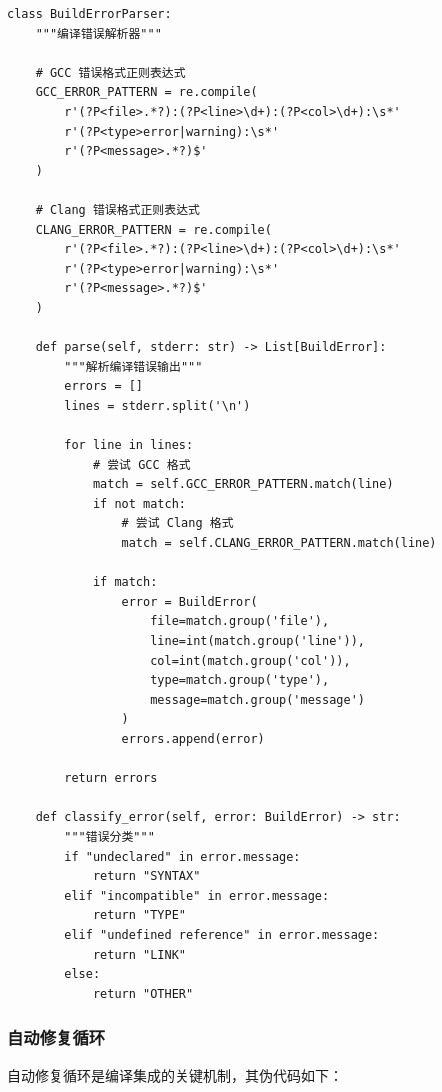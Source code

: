 \begin{lstlisting}[style=Python,abovecaptionskip=0pt,belowcaptionskip=0pt]
class BuildErrorParser:
    """编译错误解析器"""
    
    # GCC 错误格式正则表达式
    GCC_ERROR_PATTERN = re.compile(
        r'(?P<file>.*?):(?P<line>\d+):(?P<col>\d+):\s*'
        r'(?P<type>error|warning):\s*'
        r'(?P<message>.*?)$'
    )
    
    # Clang 错误格式正则表达式
    CLANG_ERROR_PATTERN = re.compile(
        r'(?P<file>.*?):(?P<line>\d+):(?P<col>\d+):\s*'
        r'(?P<type>error|warning):\s*'
        r'(?P<message>.*?)$'
    )
    
    def parse(self, stderr: str) -> List[BuildError]:
        """解析编译错误输出"""
        errors = []
        lines = stderr.split('\n')
        
        for line in lines:
            # 尝试 GCC 格式
            match = self.GCC_ERROR_PATTERN.match(line)
            if not match:
                # 尝试 Clang 格式
                match = self.CLANG_ERROR_PATTERN.match(line)
            
            if match:
                error = BuildError(
                    file=match.group('file'),
                    line=int(match.group('line')),
                    col=int(match.group('col')),
                    type=match.group('type'),
                    message=match.group('message')
                )
                errors.append(error)
        
        return errors
    
    def classify_error(self, error: BuildError) -> str:
        """错误分类"""
        if "undeclared" in error.message:
            return "SYNTAX"
        elif "incompatible" in error.message:
            return "TYPE"
        elif "undefined reference" in error.message:
            return "LINK"
        else:
            return "OTHER"
\end{lstlisting}

\subsubsection{自动修复循环}

自动修复循环是编译集成的关键机制，其伪代码如下：

